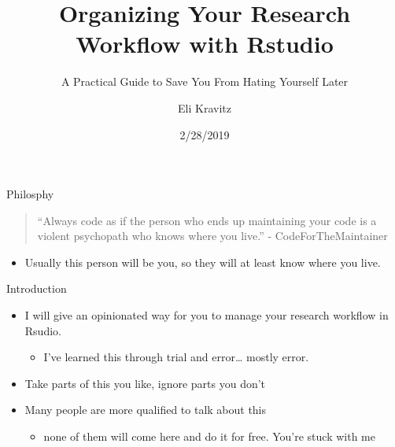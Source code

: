 \documentclass[ignorenonframetext,]{beamer}
\title{Organizing Your Research Workflow with Rstudio}
\subtitle{A Practical Guide to Save You From Hating Yourself Later}
\author{Eli Kravitz}
\date{2/28/2019}
\providecommand{\tightlist}{%
  \setlength{\itemsep}{0pt}\setlength{\parskip}{0pt}}
\begin{document}
\frame{\titlepage}

\begin{frame}{Philosphy}
\protect\hypertarget{philosphy}{}

\begin{quote}
“Always code as if the person who ends up maintaining your code is a
violent psychopath who knows where you live.” - CodeForTheMaintainer
\end{quote}

\begin{itemize}
\tightlist
\item
  Usually this person will be you, so they will at least know where you
  live.
\end{itemize}

\end{frame}

\begin{frame}{Introduction}
\protect\hypertarget{introduction}{}

\begin{itemize}
\item
  I will give an \alert{opinionated} way for you to manage your research
  workflow in Rsudio.

  \begin{itemize}
  \tightlist
  \item
    I’ve learned this through trial and error\ldots{} mostly error.
  \end{itemize}
\item
  Take parts of this you like, ignore parts you don’t
\item
  Many people are more qualified to talk about this

  \begin{itemize}
  \tightlist
  \item
    none of them will come here and do it for free. You’re stuck with me
  \end{itemize}
\end{itemize}

\end{frame}
\end{document}
